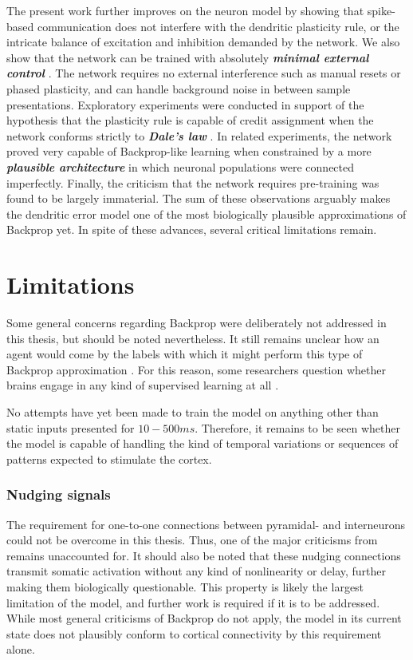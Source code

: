 The present work further improves on the neuron model by showing that spike-based communication does
not interfere with the dendritic plasticity rule, or the intricate balance of excitation and inhibition demanded by the
network. We also show that the network can be trained with absolutely \textit{\textbf{minimal external control}}
\citep{Whittington2017}. The network requires no external interference such as manual resets or phased plasticity, and
can handle background noise in between sample presentations. Exploratory experiments were conducted in support of the
hypothesis that the plasticity rule is capable of credit assignment when the network conforms strictly to
\textit{\textbf{Dale's law}} \citep{Bartunov2018}. In related experiments, the network proved very capable of
Backprop-like learning when constrained by a more \textit{\textbf{plausible architecture}} \citep{Whittington2017} in
which neuronal populations were connected imperfectly. Finally, the criticism that the network requires pre-training
\citep{whittington2019theories} was found to be largely immaterial. The sum of these observations arguably makes the
dendritic error model one of the most biologically plausible approximations of Backprop yet. In spite of these advances,
several critical limitations remain.


\section{Limitations}

Some general concerns regarding Backprop were deliberately not addressed in this thesis, but should be noted
nevertheless. It still remains unclear how an agent would come by the labels with which it might perform this type of
Backprop approximation \citep{Bengio2015}. For this reason, some researchers question whether brains engage in any kind
of supervised learning at all \citep{magee2020synaptic}. 


No attempts have yet been made to train the model on anything other than static inputs presented for $10-500ms$.
Therefore, it remains to be seen whether the model is capable of handling the kind of temporal variations or sequences
of patterns expected to stimulate the cortex.

\subsubsection*{Nudging signals}

The requirement for one-to-one connections between pyramidal- and interneurons could not be overcome in this thesis.
Thus, one of the major criticisms from \citep{whittington2019theories} remains unaccounted for. It should also be noted
that these nudging connections transmit somatic activation without any kind of nonlinearity or delay, further making
them biologically questionable. This property is likely the largest limitation of the model, and further work is
required if it is to be addressed. While most general criticisms of Backprop do not apply, the model in its current
state does not plausibly conform to cortical connectivity by this requirement alone.

